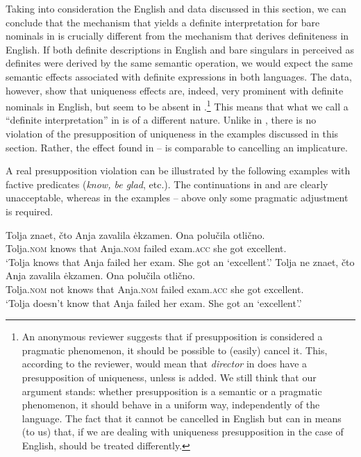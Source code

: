 \documentclass[output=paper,
colorlinks,
citecolor=brown,
newtxmath
]{langscibook}
\begin{document}
\noindent Taking into consideration the English and  data discussed in this section, we can conclude
that the mechanism that yields a definite interpretation for bare nominals in  is crucially different from the mechanism that derives definiteness in English. If both definite descriptions in English and bare singulars in  perceived as definites were derived by the same semantic operation, we would expect the same semantic effects associated with definite expressions in both languages. The data, however, show that uniqueness effects are, indeed, very prominent with definite nominals in English, but seem to be absent in .\footnote{An anonymous reviewer suggests that if presupposition is considered a pragmatic phenomenon, it should be possible to (easily) cancel it. This, according to the reviewer, would mean that \textit{director} in  does have a presupposition of uniqueness, unless  is added. We still think that our argument stands: whether presupposition is a semantic or a pragmatic phenomenon, it should behave in a uniform way, independently of the language. The fact that it cannot be cancelled in English but can in  means (to us) that, if we are dealing with uniqueness presupposition in the case of English,  should be treated differently.} This means
that what we call a ``definite interpretation'' in  is of a different nature. Unlike %
in , there is no violation of the presupposition of uniqueness in the  examples discussed in this section.
Rather, the effect found in -- is comparable to cancelling an implicature.

A real presupposition violation can be illustrated by the following examples with factive predicates (\textit{know, be glad}, etc.). The continuations in  and  are clearly unacceptable, whereas in the examples -- above only some pragmatic adjustment is required. %

\ea \label{ex:seres:i}
\gll Tolja		znaet,	čto		Anja		zavalila	ėkzamen.	\minsp{\#} Ona	polučila 	otlično. \\
Tolja.\textsc{nom} knows that 	Anja.\textsc{nom}	failed 		exam.\textsc{acc}  {} she 	got 		excellent.\\
\glt `Tolja knows that Anja failed her exam. She got an `excellent'.'
\z
\ea \label{ex:seres:ii}
\gll Tolja		ne		znaet, čto 		Anja 		zavalila	ėkzamen. \minsp{\#} Ona	polučila	otlično. \\
Tolja.\textsc{nom}  not	knows that 	Anja.\textsc{nom}	failed 		exam.\textsc{acc} {} she	got 		excellent.\\
\glt `Tolja doesn't know that Anja failed her exam. She got an `excellent'.'
\z
\end{document}
